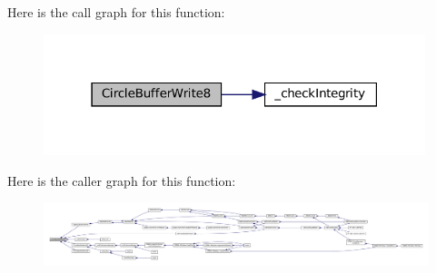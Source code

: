 Here is the call graph for this function\+:
\nopagebreak
\begin{figure}[H]
\begin{center}
\leavevmode
\includegraphics[width=315pt]{circle-buffer_8c_aa1562239ba1cf3c0e7d570a184bcbd7b_cgraph}
\end{center}
\end{figure}
Here is the caller graph for this function\+:
\nopagebreak
\begin{figure}[H]
\begin{center}
\leavevmode
\includegraphics[width=350pt]{circle-buffer_8c_aa1562239ba1cf3c0e7d570a184bcbd7b_icgraph}
\end{center}
\end{figure}
